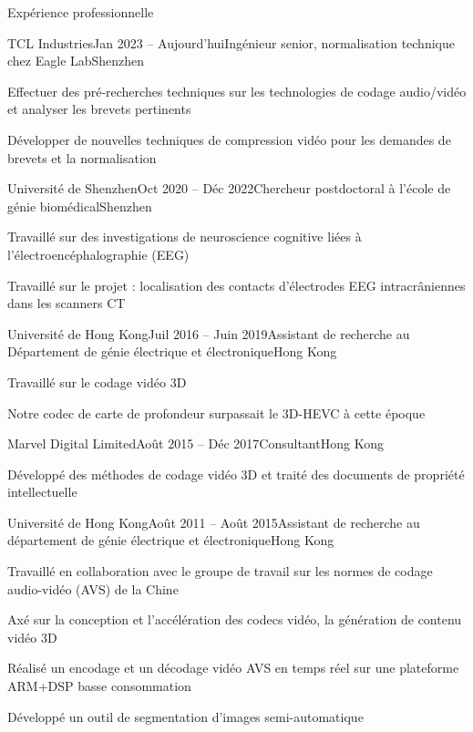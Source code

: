 \documentclass{resume} %
\begin{document}
\begin{rSection}{Expérience professionnelle}
	\begin{rSubsection}{TCL Industries}{Jan 2023 -- Aujourd'hui}{Ingénieur senior, normalisation technique chez Eagle Lab}{Shenzhen}
		\item Effectuer des pré-recherches techniques sur les technologies de codage audio/vidéo et analyser les brevets pertinents
		\item Développer de nouvelles techniques de compression vidéo pour les demandes de brevets et la normalisation
	\end{rSubsection}
	
	\begin{rSubsection}{Université de Shenzhen}{Oct 2020 -- Déc 2022}{Chercheur postdoctoral à l'école de génie biomédical}{Shenzhen}
		\item Travaillé sur des investigations de neuroscience cognitive liées à l'électroencéphalographie (EEG)
		\item Travaillé sur le projet : localisation des contacts d'électrodes EEG intracrâniennes dans les scanners CT
	\end{rSubsection}
	
	\begin{rSubsection}{Université de Hong Kong}{Juil 2016 -- Juin 2019}{Assistant de recherche au Département de génie électrique et électronique}{Hong Kong}
		\item Travaillé sur le codage vidéo 3D
		\item Notre codec de carte de profondeur surpassait le 3D-HEVC à cette époque
	\end{rSubsection}
	
	\begin{rSubsection}{Marvel Digital Limited}{Août 2015 -- Déc 2017}{Consultant}{Hong Kong}
		\item Développé des méthodes de codage vidéo 3D et traité des documents de propriété intellectuelle 
	\end{rSubsection}
	
	\begin{rSubsection}{Université de Hong Kong}{Août 2011 -- Août 2015}{Assistant de recherche au département de génie électrique et électronique}{Hong Kong}
		\item Travaillé en collaboration avec le groupe de travail sur les normes de codage audio-vidéo (AVS) de la Chine
		\item Axé sur la conception et l'accélération des codecs vidéo, la génération de contenu vidéo 3D
		\item Réalisé un encodage et un décodage vidéo AVS en temps réel sur une plateforme ARM+DSP basse consommation
		\item Développé un outil de segmentation d'images semi-automatique
	\end{rSubsection}
	

\end{rSection}
\end{document}
